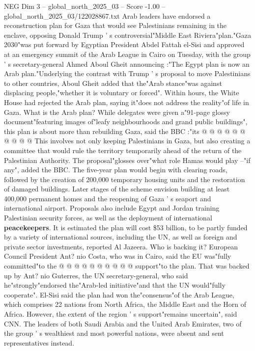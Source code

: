 \begin{textsample}{NEG Dim 3 – global\_north\_2025\_03 – Score -1.00 – global\_north\_2025\_03/122028867.txt}  \label{ex:f3_neg_431}
Arab leaders have endorsed a reconstruction plan for Gaza that would see Palestinians remaining in the enclave, opposing Donald Trump ' s controversial"Middle East Riviera"plan."Gaza 2030"was put forward by Egyptian President Abdel Fattah el-Sisi and approved at an emergency summit of the Arab League in Cairo on Tuesday, with the group ' s secretary-general Ahmed Aboul Gheit announcing :"The Egypt plan is now an Arab plan."Underlying the contrast with Trump ' s proposal to move Palestinians to other countries, Aboul Gheit added that the"Arab stance"was against displacing people,"whether it is voluntary or forced".
Within hours, the White House had rejected the Arab plan, saying it"does not address the reality"of life in Gaza.
What is the Arab plan?
While delegates were given a"91-page glossy document"featuring images of"leafy neighbourhoods and grand public buildings", this plan is about more than rebuilding Gaza, said the BBC :"its @ @ @ @ @ @ @ @ @ @ This involves not only keeping Palestinians in Gaza, but also creating a committee that would rule the territory temporarily ahead of the return of the Palestinian Authority.
The proposal"glosses over"what role Hamas would play --"if any", added the BBC.
The five-year plan would begin with clearing roads, followed by the creation of 200,000 temporary housing units and the restoration of damaged buildings.
Later stages of the scheme envision building at least 400,000 permanent homes and the reopening of Gaza ' s seaport and international airport.
Proposals also include Egypt and Jordan training Palestinian security forces, as well as the deployment of international \textbf{peacekeepers}.
It is estimated the plan will cost \$53 billion, to be partly funded by a variety of international sources, including the UN, as well as foreign and private sector investments, reported Al Jazeera.
Who is backing it?
European Council President Ant? nio Costa, who was in Cairo, said the EU was"fully committed"to the @ @ @ @ @ @ @ @ @ @ support"to the plan.
That was backed up by Ant? nio Guterres, the UN secretary-general, who said he"strongly"endorsed the"Arab-led initiative"and that the UN would"fully cooperate".
El-Sisi said the plan had won the"consensus"of the Arab League, which comprises 22 nations from North Africa, the Middle East and the Horn of Africa.
However, the extent of the region ' s support"remains uncertain", said CNN.
The leaders of both Saudi Arabia and the United Arab Emirates, two of the group ' s wealthiest and most powerful nations, were absent and sent representatives instead.

\end{textsample}
